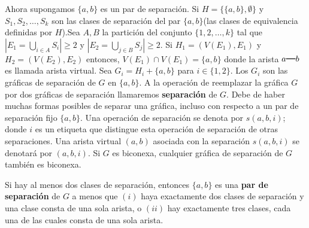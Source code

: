 Ahora supongamos $\{a, b\}$ es un par de separación. Si $H=\{\{a, b\}, \emptyset\}$ y $S_{1},S_{2}, \ldots, S_{k}$ son las clases de separación del par $\{a, b\}$(las clases de equivalencia definidas por $H$).Sea $A, B$ la partición del conjunto $\{1,2,\ldots,k\}$ tal que $|E_1 = \bigcup_{i \in A} S_i| \geq 2$ y $ |E_{2}= \bigcup_{j \in B} S_j| \geq 2$. Si $H_{1} = (V(E_{1}), E_{1})$ y $H_{2} = (V(E_{2}), E_{2})$ entonces, $V(E_{1}) \cap V(E_{1}) = \{a, b\}$ donde la arista $a\rule[1mm]{4mm}{0.3mm} b$ es llamada arista virtual. Sea $G_{i} = H_{i} + \{a, b\}$ para $i \in \{1, 2\}$. Los $G_{i}$ son las gráficas de separación de $G$ en $\{a, b\}$. A la operación de reemplazar la gráfica $G$ por dos gráficas de separación llamaremos \textbf{separación} de $G$. Debe de haber muchas formas posibles de separar una gráfica, incluso con respecto a un par de separación fijo $\{a, b\}$. Una operación de separación se denota por $s\left(a, b, i\right)$; donde $i$ es un etiqueta que distingue esta operación de separación de otras separaciones. Una arista virtual $\left(a, b\right)$ asociada con la separación $s\left(a, b, i\right)$ se denotará por $\left(a, b, i\right)$. Si $G$ es biconexa, cualquier gráfica de separación de $G$ también es biconexa.

Si hay al menos dos clases de separación, entonces $\{a, b\}$ es una \textbf{par de separación} de $G$ a menos que $(i)$ haya exactamente dos clases de separación y una clase consta de una sola arista, o $(ii)$ hay exactamente tres clases, cada una de las cuales consta de una sola arista.

